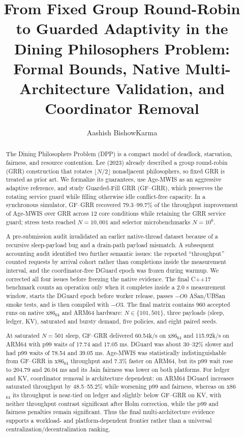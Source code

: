 \documentclass[10pt,journal]{IEEEtran}
\title{From Fixed Group Round-Robin to Guarded Adaptivity in the Dining Philosophers Problem:\\Formal Bounds, Native Multi-Architecture Validation, and Coordinator Removal}
\author{Aashish BishowKarma}
\begin{document}
\maketitle

\begin{abstract}
The Dining Philosophers Problem (DPP) is a compact model of deadlock, starvation, fairness, and resource contention. Lee (2023) already described a group round-robin (GRR) construction that rotates $\lfloor N/2\rfloor$ nonadjacent philosophers, so fixed GRR is treated as prior art. We formalize its guarantees, use Age-MWIS as an aggressive adaptive reference, and study Guarded-Fill GRR (GF--GRR), which preserves the rotating service guard while filling otherwise idle conflict-free capacity. In a synchronous simulator, GF--GRR recovered 79.3--99.7\% of the throughput improvement of Age-MWIS over GRR across 12 core conditions while retaining the GRR service guard; stress tests reached $N=10{,}001$ and selector microbenchmarks $N=10^6$.

A pre-submission audit invalidated an earlier native-thread dataset because of a recursive sleep-payload bug and a drain-path payload mismatch. A subsequent accounting audit identified two further semantic issues: the reported ``throughput'' counted requests by arrival cohort rather than completions inside the measurement interval, and the coordinator-free DGuard epoch was frozen during warmup. We corrected all four issues before freezing the native evidence. The final C++17 benchmark counts an operation only when it completes inside a 2.0 s measurement window, starts the DGuard epoch before worker release, passes $-O0$ ASan/UBSan smoke tests, and is then compiled with $-O3$. The final matrix contains 960 accepted runs on native x86$_{64}$ and ARM64 hardware: $N\in\{101,501\}$, three payloads (sleep, ledger, KV), saturated and bursty demand, five policies, and eight paired seeds.

At saturated $N=501$ sleep, GF--GRR delivered 60.54k/s on x86$_{64}$ and 115.92k/s on ARM64 with p99 waits of 17.74 and 17.05 ms. DGuard was about 30--32\% slower and had p99 waits of 78.54 and 39.05 ms. Age-MWIS was statistically indistinguishable from GF--GRR in x86$_{64}$ throughput and 7.3\% faster on ARM64, but its p99 wait rose to 204.79 and 26.04 ms and its Jain fairness was lower on both platforms. For ledger and KV, coordinator removal is architecture dependent: on ARM64 DGuard increases saturated throughput by 48.5--55.2\% while worsening p99 and fairness, whereas on x86$_{64}$ its throughput is near-tied on ledger and slightly below GF--GRR on KV, with neither throughput contrast significant after Holm correction, while the p99 and fairness penalties remain significant. Thus the final multi-architecture evidence supports a workload- and platform-dependent frontier rather than a universal centralization/decentralization ranking.
\end{abstract}
\end{document}
